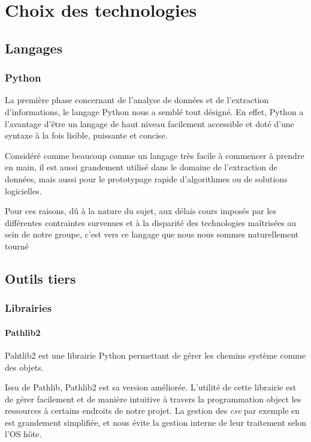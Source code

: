 \documentclass{article}
\begin{document}
    \section{Choix des technologies}

    \subsection{Langages}

    \subsubsection{Python}

    La première phase concernant de l'analyse de données et de l'extraction d'informations, le langage Python nous a semblé tout désigné.
    En effet, Python a l'avantage d'être un langage de haut niveau facilement accessible et doté d'une syntaxe à la fois lisible, puissante et concise.

    Considéré comme beaucoup comme un langage très facile à commencer à prendre en main, il est aussi grandement utilisé dans le domaine de l'extraction de données, mais aussi pour le prototypage rapide d'algorithmes ou de solutions logicielles.

    Pour ces raisons, dû à la nature du sujet, aux délais cours imposés par les différentes contraintes survenues et à la disparité des technologies maîtrisées au sein de notre groupe, c'est vers ce langage que nous nous sommes naturellement tourné

    \subsection{Outils tiers}

    \subsubsection{Librairies}

    \paragraph{Pathlib2}

    Pahtlib2 est une librairie Python permettant de gérer les chemins système comme des objets.

    Issu de Pathlib, Pathlib2 est sa version améliorée.
    L'utilité de cette librairie est de gérer facilement et de manière intuitive à travers la programmation object les ressources à certains endroits de notre projet.
    La gestion des \textit{csv} par exemple en est grandement simplifiée, et nous évite la gestion interne de leur traitement selon l'OS hôte.
\end{document}
